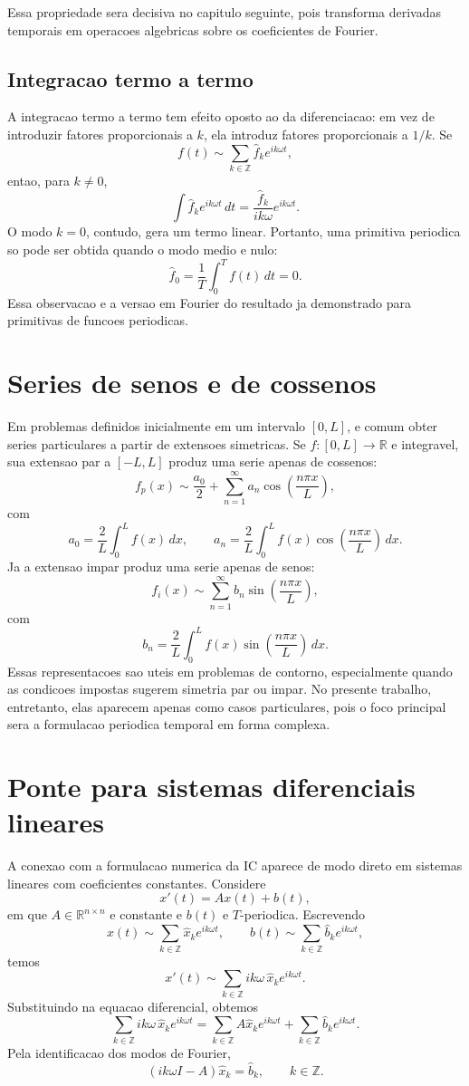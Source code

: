 Essa propriedade sera decisiva no capitulo seguinte, pois transforma derivadas
temporais em operacoes algebricas sobre os coeficientes de Fourier.

\subsection{Integracao termo a termo}

A integracao termo a termo tem efeito oposto ao da diferenciacao: em vez de
introduzir fatores proporcionais a \(k\), ela introduz fatores proporcionais a
\(1/k\). Se
\[
f(t)\sim \sum_{k\in\mathbb{Z}}\widehat f_k e^{ik\omega t},
\]
entao, para \(k\neq0\),
\[
\int \widehat f_k e^{ik\omega t}\,dt
=
\frac{\widehat f_k}{ik\omega}e^{ik\omega t}.
\]
O modo \(k=0\), contudo, gera um termo linear. Portanto, uma primitiva
periodica so pode ser obtida quando o modo medio e nulo:
\[
\widehat f_0=
\frac{1}{T}\int_0^T f(t)\,dt=0.
\]
Essa observacao e a versao em Fourier do resultado ja demonstrado para
primitivas de funcoes periodicas.

\section{Series de senos e de cossenos}

Em problemas definidos inicialmente em um intervalo \([0,L]\), e comum obter
series particulares a partir de extensoes simetricas. Se \(f:[0,L]\to\mathbb{R}\)
e integravel, sua extensao par a \([-L,L]\) produz uma serie apenas de cossenos:
\[
f_p(x)\sim
\frac{a_0}{2}
+
\sum_{n=1}^{\infty}a_n\cos\left(\frac{n\pi x}{L}\right),
\]
com
\[
a_0=\frac{2}{L}\int_0^L f(x)\,dx,
\qquad
a_n=\frac{2}{L}\int_0^L
f(x)\cos\left(\frac{n\pi x}{L}\right)\,dx.
\]
Ja a extensao impar produz uma serie apenas de senos:
\[
f_i(x)\sim
\sum_{n=1}^{\infty}b_n\sin\left(\frac{n\pi x}{L}\right),
\]
com
\[
b_n=\frac{2}{L}\int_0^L
f(x)\sin\left(\frac{n\pi x}{L}\right)\,dx.
\]
Essas representacoes sao uteis em problemas de contorno, especialmente quando
as condicoes impostas sugerem simetria par ou impar. No presente trabalho,
entretanto, elas aparecem apenas como casos particulares, pois o foco principal
sera a formulacao periodica temporal em forma complexa.

\section{Ponte para sistemas diferenciais lineares}

A conexao com a formulacao numerica da IC aparece de modo direto em sistemas
lineares com coeficientes constantes. Considere
\[
x'(t)=Ax(t)+b(t),
\]
em que \(A\in\mathbb{R}^{n\times n}\) e constante e \(b(t)\) e \(T\)-periodica.
Escrevendo
\[
x(t)\sim\sum_{k\in\mathbb{Z}}\widehat x_k e^{ik\omega t},
\qquad
b(t)\sim\sum_{k\in\mathbb{Z}}\widehat b_k e^{ik\omega t},
\]
temos
\[
x'(t)\sim
\sum_{k\in\mathbb{Z}}ik\omega\,\widehat x_k e^{ik\omega t}.
\]
Substituindo na equacao diferencial, obtemos
\[
\sum_{k\in\mathbb{Z}}ik\omega\,\widehat x_k e^{ik\omega t}
=
\sum_{k\in\mathbb{Z}}A\widehat x_k e^{ik\omega t}
+
\sum_{k\in\mathbb{Z}}\widehat b_k e^{ik\omega t}.
\]
Pela identificacao dos modos de Fourier,
\[
(ik\omega I-A)\widehat x_k=\widehat b_k,
\qquad k\in\mathbb{Z}.
\]

